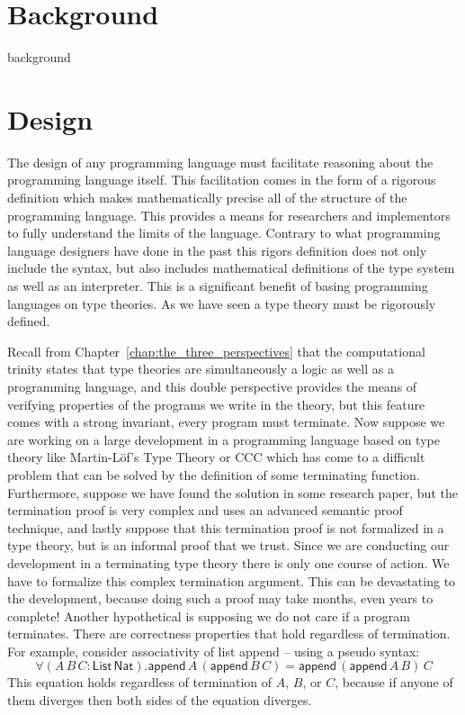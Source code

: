 \documentclass[phd,appendix,dedicationpage,ackpage,epigraphpage]{uithesis}
\begin{document}
\part{Background}          
\label{part:background}
{background}

\part{Design}
\label{part:design}
The design of any programming language must facilitate reasoning about
the programming language itself.  This facilitation comes in the form
of a rigorous definition which makes mathematically precise all of the
structure of the programming language.  This provides a means for
researchers and implementors to fully understand the limits of the
language.  Contrary to what programming language designers have done
in the past this rigors definition does not only include the syntax,
but also includes mathematical definitions of the type system as well
as an interpreter. This is a significant benefit of basing programming
languages on type theories.  As we have seen a type theory must be
rigorously defined.  

Recall from Chapter~\ref{chap:the_three_perspectives} that the
computational trinity states that type theories are simultaneously a
logic as well as a programming language, and this double perspective
provides the means of verifying properties of the programs we write in
the theory, but this feature comes with a strong invariant, every
program must terminate.  Now suppose we are working on a large
development in a programming language based on type theory like
Martin-L\"of's Type Theory or CCC which has come to a difficult
problem that can be solved by the definition of some terminating
function.  Furthermore, suppose we have found the solution in some
research paper, but the termination proof is very complex and uses an
advanced semantic proof technique, and lastly suppose that this
termination proof is not formalized in a type theory, but is an
informal proof that we trust.  Since we are conducting our development
in a terminating type theory there is only one course of action.  We
have to formalize this complex termination argument. This can be
devastating to the development, because doing such a proof may take
months, even years to complete!  Another hypothetical is supposing we
do not care if a program terminates.  There are correctness properties
that hold regardless of termination.  For example, consider
associativity of list append -- using a pseudo syntax:
\[ \forall (A\,B\,C :
\mathsf{List}\,\mathsf{Nat}).\mathsf{append}\,A\,(\mathsf{append}\,B\,C)
= \mathsf{append}\,(\mathsf{append}\,A\,B)\,C \] This equation holds
regardless of termination of $A$, $B$, or $C$, because if anyone of
them diverges then both sides of the equation diverges.  
\end{document}
